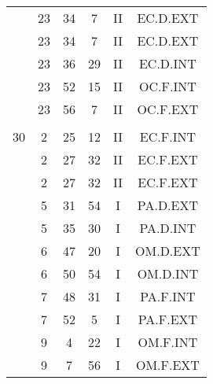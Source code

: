 \documentclass[12pt, a4paper]{article}
\begin{document}
\begin{multicols}{3}
{\begin{tabular}{c c c c c c}
	 	 	 	 & 23 & 34 & 7 & II & EC.D.EXT\\%
	 	 	 	 & 23 & 34 & 7 & II & EC.D.EXT\\%
	 	 	 	 & 23 & 36 & 29 & II & EC.D.INT\\%
	 	 	 	 & 23 & 52 & 15 & II & OC.F.INT\\%
	 	 	 	 & 23 & 56 & 7 & II & OC.F.EXT\\%
	 	 	 	 & & & & & \\%
	 	 	 	30 & 2 & 25 & 12 & II & EC.F.INT\\%
	 	 	 	 & 2 & 27 & 32 & II & EC.F.EXT\\%
	 	 	 	 & 2 & 27 & 32 & II & EC.F.EXT\\%
	 	 	 	 & 5 & 31 & 54 & I & PA.D.EXT\\%
	 	 	 	 & 5 & 35 & 30 & I & PA.D.INT\\%
	 	 	 	 & 6 & 47 & 20 & I & OM.D.EXT\\%
	 	 	 	 & 6 & 50 & 54 & I & OM.D.INT\\%
	 	 	 	 & 7 & 48 & 31 & I & PA.F.INT\\%
	 	 	 	 & 7 & 52 & 5 & I & PA.F.EXT\\%
	 	 	 	 & 9 & 4 & 22 & I & OM.F.INT\\%
	 	 	 	 & 9 & 7 & 56 & I & OM.F.EXT\\%
	 	 \end{tabular}
 	}
\end{multicols}
\end{document}
